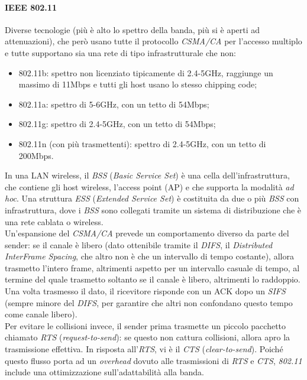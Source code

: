 \paragraph{IEEE 802.11}
Diverse tecnologie (più è alto lo spettro della banda, più si è aperti ad attenuazioni), che però usano tutte il protocollo \textit{CSMA/CA} per l'accesso multiplo e tutte supportano sia una rete di tipo infrastrutturale che non:
\begin{itemize}
	\item 802.11b: spettro non licenziato tipicamente di 2.4-5GHz, raggiunge un massimo di 11Mbps e tutti gli host usano lo stesso chipping code;
	\item 802.11a: spettro di 5-6GHz, con un tetto di 54Mbps;
	\item 802.11g: spettro di 2.4-5GHz, con un tetto di 54Mbps;
	\item 802.11n (con più trasmettenti): spettro di 2.4-5GHz, con un tetto di 200Mbps.
\end{itemize}

In una LAN wireless, il \textit{BSS} (\textit{Basic Service Set}) è una cella dell'infrastruttura, che contiene gli host wireless, l'access point (AP) e che supporta la modalità \textit{ad hoc}. Una struttura \textit{ESS} (\textit{Extended Service Set}) è costituita da due o più \textit{BSS} con infrastruttura, dove i \textit{BSS} sono collegati tramite un sistema di distribuzione che è una rete cablata o wireless. \\
Un'espansione del \textit{CSMA/CA} prevede un comportamento diverso da parte del sender: se il canale è libero (dato ottenibile tramite il \textit{DIFS}, il \textit{Distributed InterFrame Spacing}, che altro non è che un intervallo di tempo costante), allora trasmetto l'intero frame, altrimenti aspetto per un intervallo casuale di tempo, al termine del quale trasmetto soltanto se il canale è libero, altrimenti lo raddoppio. Una volta trasmesso il dato, il ricevitore risponde con un ACK dopo un \textit{SIFS} (sempre minore del \textit{DIFS}, per garantire che altri non confondano questo tempo come canale libero). \\
Per evitare le collisioni invece, il sender prima trasmette un piccolo pacchetto chiamato \textit{RTS} (\textit{request-to-send}): se questo non cattura collisioni, allora apro la trasmissione effettiva. In risposta all'\textit{RTS}, vi è il \textit{CTS} (\textit{clear-to-send}).
Poiché questo flusso porta ad un \textit{overhead} dovuto alle trasmissioni di \textit{RTS} e \textit{CTS}, \textit{802.11} include una ottimizzazione sull'adattabilità alla banda.

